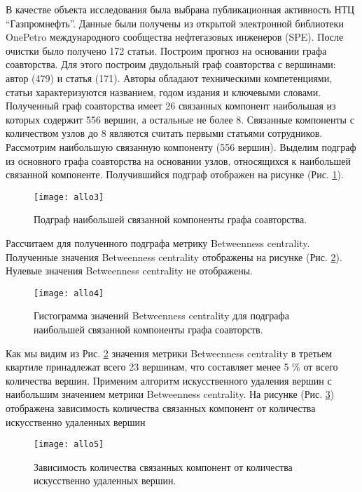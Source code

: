 В качестве объекта исследования была выбрана публикационная активность НТЦ ``Газпромнефть''. Данные были получены из открытой электронной библиотеки OnePetro международного сообщества нефтегазовых инженеров (SPE). После очистки было получено 172 статьи.
Построим прогноз на основании графа соавторства. Для этого построим двудольный граф соавторства с вершинами: автор (479) и статья (171). Авторы обладают техническими компетенциями, статьи характеризуются названием, годом издания и ключевыми словами.
Полученный граф соавторства имеет 26 связанных компонент наибольшая из которых содержит 556 вершин, а остальные не более 8. Связанные компоненты с количеством узлов до 8 являются считать первыми статьями сотрудников.
Рассмотрим наибольшую связанную компоненту (556 вершин). Выделим подграф из основного графа соавторства на основании узлов, относящихся к наибольшей связанной компоненте. Получившийся подграф отображен на рисунке (Рис. \ref{fig:allo3}).

\begin{figure}[H]
  \caption{Подграф наибольшей связанной компоненты графа соавторства.}
  \centering
    \texttt{[image: allo3]}
  \label{fig:allo3}
\end{figure}  

Рассчитаем для полученного подграфа метрику Betweenness centrality. Полученные значения Betweenness centrality отображены на рисунке (Рис. \ref{fig:allo4}). Нулевые значения Betweenness centrality не отображены.

\begin{figure}[H]
  \caption{Гистограмма значений Betweenness centrality для подграфа наибольшей связанной компоненты графа соавторств.}
  \centering
    \texttt{[image: allo4]}
  \label{fig:allo4}
\end{figure}  

Как мы видим из Рис. \ref{fig:allo4} значения метрики Betweenness centrality в третьем квартиле принадлежат всего 23 вершинам, что составляет менее 5 \% от всего количества вершин.
Применим алгоритм искусственного удаления вершин с наибольшим значением метрики Betweenness centrality. На рисунке (Рис. \ref{fig:allo5}) отображена зависимость количества связанных компонент от количества искусственно удаленных вершин

\begin{figure}[H]
  \caption{Зависимость количества связанных компонент от количества искусственно удаленных вершин.}
  \centering
    \texttt{[image: allo5]}
  \label{fig:allo5}
\end{figure}  

